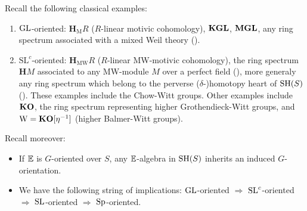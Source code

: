 \begin{ex} Recall the following classical examples:
\begin{enumerate}
\item $\mathrm{GL}$-oriented: $\mathbf{H}_{\mathrm{M}}R$ ($R$-linear motivic cohomology), $\mathbf{KGL}$, $\mathbf{MGL}$, any ring spectrum associated
with a mixed Weil theory (\cite{CD2}).
\item $\mathrm{SL}^c$-oriented: $\mathbf{H}_{\mathrm{MW}}R$ ($R$-linear MW-motivic cohomology), 
the ring spectrum $\mathbf{H}M$ associated to any MW-module $M$ over a perfect field (\cite{Feld1, Feld2}),
more generaly any ring spectrum which belong to the perverse ($\delta$-)homotopy heart of $\operatorname{SH}(S)$ (\cite{BD1}).
These examples include the Chow-Witt groups. Other examples include $\mathbf{KO}$, the ring spectrum representing higher Grothendieck-Witt groups, and
$\operatorname{W}=\mathbf{KO}[\eta^{-1}]$ (higher Balmer-Witt groups).
\end{enumerate}
Recall moreover:
\begin{itemize}
\item  If $\mathbb E$ is $G$-oriented over $S$, any $\mathbb E$-algebra in $\operatorname{SH}(S)$ inherits
an induced $G$-orientation. 
\item We have the following string of implications: $\mathrm{GL}$-oriented $\Rightarrow$ $\mathrm{SL}^c$-oriented $\Rightarrow$ $\mathrm{SL}$-oriented $\Rightarrow$ $\mathrm{Sp}$-oriented.
\end{itemize}
\end{ex}

